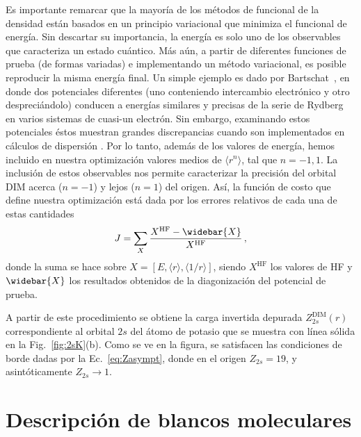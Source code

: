 Es importante remarcar que la mayoría de los métodos de funcional de la 
densidad están basados en un principio variacional que minimiza el 
funcional de energía. Sin descartar su importancia, la energía es solo
uno de los observables que caracteriza un estado cuántico. Más aún, a 
partir de diferentes funciones de prueba (de formas variadas) e 
implementando un método variacional, es posible reproducir la misma 
energía final. Un simple ejemplo es dado por 
Bartschat~\cite{Albright:93,Bartschat:96}, en donde dos potenciales
diferentes (uno conteniendo intercambio electrónico y otro 
despreciándolo) conducen a energías similares y precisas de la serie de 
Rydberg en varios sistemas de cuasi-un electrón. Sin embargo, examinando 
estos potenciales éstos muestran grandes discrepancias cuando son 
implementados en cálculos de dispersión \cite{BartschatBray:96}. Por lo 
tanto, además de los valores de energía, hemos incluido en nuestra 
optimización valores medios de $\langle r^{n} \rangle$, tal que 
$n=-1,1$. La inclusión de estos observables nos permite caracterizar la 
precisión del orbital DIM acerca ($n=-1$) y lejos ($n=1$) del origen. 
Así, la función de costo que define nuestra optimización está dada por 
los errores relativos de cada una de estas cantidades
\begin{equation}
J=\sum_X \frac{X^{\mathrm{HF}}-\widebar{X}}{X^{\mathrm{HF}}}\,,
\label{eq:fncosto-dim}
\end{equation}
donde la suma se hace sobre $X=\left[E,\langle r \rangle,\langle 1/r \rangle\right]$,
siendo $X^{\mathrm{HF}}$ los valores de HF y $\widebar{X}$ los 
resultados obtenidos de la diagonización del potencial de prueba. 

A partir de este procedimiento se obtiene la carga invertida depurada 
$Z_{2s}^{\mathrm{DIM}}(r)$ correspondiente al orbital $2s$ del átomo 
de potasio que se muestra con línea sólida en la Fig.~\ref{fig:2sK}(b).
Como se ve en la figura, se satisfacen las condiciones de borde dadas 
por la Ec.~\ref{eq:Zasympt}, donde en el origen $Z_{2s} = 19$, y 
asintóticamente $Z_{2s} \rightarrow 1$.

\section{Descripción de blancos moleculares}
\label{sec:moleculas}

